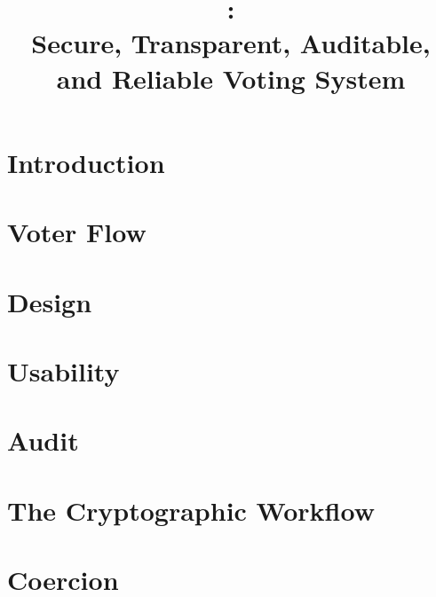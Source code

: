 \documentclass[letterpaper, 10pt, twocolumn]{article}
\title{\projname: \\
Secure, Transparent, Auditable, and Reliable Voting System}
\begin{document}
\maketitle

\begin{abstract}

\end{abstract}

\section{Introduction}


\section{Voter Flow}


\section{Design}


\section{Usability}


\section{Audit}


\section{The Cryptographic Workflow}


\section{Coercion}




\end{document}
